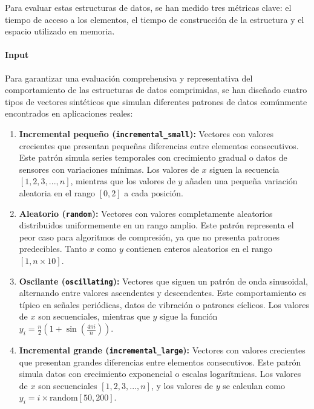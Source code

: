 Para evaluar estas estructuras de datos, se han medido tres métricas clave: el tiempo de acceso a los elementos, el tiempo de construcción de la estructura y el espacio utilizado en memoria. 

\paragraph{Input}
\vspace{0.2cm}

Para garantizar una evaluación comprehensiva y representativa del comportamiento de las estructuras de datos comprimidas, se han diseñado cuatro tipos de vectores sintéticos que simulan diferentes patrones de datos comúnmente encontrados en aplicaciones reales:

\begin{enumerate}
    \item \textbf{Incremental pequeño (\texttt{incremental\_small}):} Vectores con valores crecientes que presentan pequeñas diferencias entre elementos consecutivos. Este patrón simula series temporales con crecimiento gradual o datos de sensores con variaciones mínimas. Los valores de $x$ siguen la secuencia $[1, 2, 3, ..., n]$, mientras que los valores de $y$ añaden una pequeña variación aleatoria en el rango $[0, 2]$ a cada posición.

    \item \textbf{Aleatorio (\texttt{random}):} Vectores con valores completamente aleatorios distribuidos uniformemente en un rango amplio. Este patrón representa el peor caso para algoritmos de compresión, ya que no presenta patrones predecibles. Tanto $x$ como $y$ contienen enteros aleatorios en el rango $[1, n \times 10]$.

    \item \textbf{Oscilante (\texttt{oscillating}):} Vectores que siguen un patrón de onda sinusoidal, alternando entre valores ascendentes y descendentes. Este comportamiento es típico en señales periódicas, datos de vibración o patrones cíclicos. Los valores de $x$ son secuenciales, mientras que $y$ sigue la función $y_i = \frac{n}{2}(1 + \sin(\frac{4\pi i}{n}))$.

    \item \textbf{Incremental grande (\texttt{incremental\_large}):} Vectores con valores crecientes que presentan grandes diferencias entre elementos consecutivos. Este patrón simula datos con crecimiento exponencial o escalas logarítmicas. Los valores de $x$ son secuenciales $[1, 2, 3, ..., n]$, y los valores de $y$ se calculan como $y_i = i \times \text{random}[50, 200]$.
\end{enumerate}

